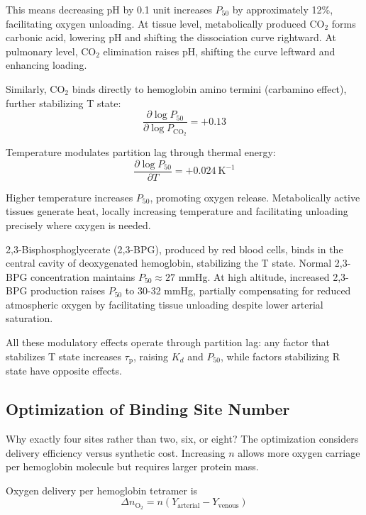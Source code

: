 \documentclass[12pt,a4paper]{article}
\theoremstyle{remark}
\newcommand{\taulag}{\tau_{\mathrm{p}}}
\begin{document}
This means decreasing pH by 0.1 unit increases $P_{50}$ by approximately 12\%, facilitating oxygen unloading. At tissue level, metabolically produced CO$_{2}$ forms carbonic acid, lowering pH and shifting the dissociation curve rightward. At pulmonary level, CO$_{2}$ elimination raises pH, shifting the curve leftward and enhancing loading.

Similarly, CO$_{2}$ binds directly to hemoglobin amino termini (carbamino effect), further stabilizing T state:
\begin{equation}
\frac{\partial \log P_{50}}{\partial \log P_{\mathrm{CO}_{2}}} = +0.13
\end{equation}

Temperature modulates partition lag through thermal energy:
\begin{equation}
\frac{\partial \log P_{50}}{\partial T} = +0.024~\mathrm{K}^{-1}
\end{equation}

Higher temperature increases $P_{50}$, promoting oxygen release. Metabolically active tissues generate heat, locally increasing temperature and facilitating unloading precisely where oxygen is needed.

2,3-Bisphosphoglycerate (2,3-BPG), produced by red blood cells, binds in the central cavity of deoxygenated hemoglobin, stabilizing the T state. Normal 2,3-BPG concentration maintains $P_{50} \approx 27$ mmHg. At high altitude, increased 2,3-BPG production raises $P_{50}$ to 30-32 mmHg, partially compensating for reduced atmospheric oxygen by facilitating tissue unloading despite lower arterial saturation.

All these modulatory effects operate through partition lag: any factor that stabilizes T state increases $\taulag$, raising $K_{d}$ and $P_{50}$, while factors stabilizing R state have opposite effects.

\subsection{Optimization of Binding Site Number}

Why exactly four sites rather than two, six, or eight? The optimization considers delivery efficiency versus synthetic cost. Increasing $n$ allows more oxygen carriage per hemoglobin molecule but requires larger protein mass.

Oxygen delivery per hemoglobin tetramer is
\begin{equation}
\Delta n_{\mathrm{O}_{2}} = n(Y_{\mathrm{arterial}} - Y_{\mathrm{venous}})
\end{equation}
\end{document}
